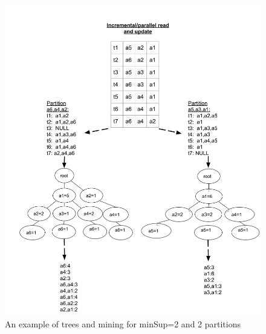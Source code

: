\documentclass[sigconf, nonacm]{acmart}
\begin{document}
\begin{figure}
  \centering
  \includegraphics[width=\linewidth]{figures/IncrementalTreeMining}
  \caption{An example of trees and mining for minSup=2 and 2 partitions}
  \label{fig:incrementalParallelMining}
\end{figure}


\end{document}
